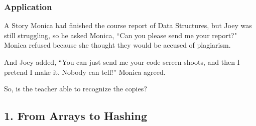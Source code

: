 \documentclass[aspectratio=169, 14pt]{beamer}
\begin{document}
\begin{frame}
    \frametitle{Application}
    \begin{exampleblock}{A Story}
Monica had finished the course report of Data Structures, but Joey was still struggling, so he asked Monica, ``Can you please send me your report?" Monica refused because she thought they would be accused of plagiarism.

And Joey added, ``You can just send me your code screen shoots, and then I pretend I make it. Nobody can tell!'' Monica agreed.
    \end{exampleblock}

    \alert{So, is the teacher able to recognize the copies?}
\end{frame}
{
    \begin{frame}
        \section{\textcolor{darkmidnightblue}{1. From Arrays to Hashing}}
    \end{frame}

}
\end{document}
